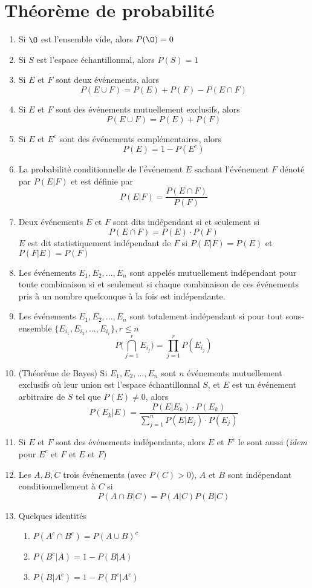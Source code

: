 \documentclass{article}
\renewcommand{\emptyset}{\O}
\begin{document}
\section*{Théorème de probabilité}
	\begin{enumerate}
		\item Si $\emptyset$ est l'ensemble vide, alors $P(\emptyset)=0$
		\item Si $S$ est l'espace échantillonnal, alors $P(S)=1$
		\item Si $E$ et $F$ sont deux événements, alors
		\[P(E\cup F) = P(E) + P(F) - P(E\cap F)\]
		\item Si $E$ et $F$ sont des événements mutuellement exclusifs, alors
		\[P(E\cup F) = P(E) + P(F)\]
		\item Si $E$ et $E^c$ sont des événements complémentaires, alors
		\[P(E) = 1 - P(E^c)\]
		\item La probabilité conditionnelle de l'événement $E$ sachant l'événement $F$ dénoté par $P(E|F)$ et est définie par
		\[P(E|F)=\frac{P(E\cap F)}{P(F)}\]
		\item Deux événements $E$ et $F$ sont dits indépendant si et seulement si
		\[P(E\cap F)=P(E)\cdot P(F)\]
		$E$ est dit statistiquement indépendant de $F$ si $P(E|F)=P(E)$ et $P(F|E)=P(F)$
		\item Les événements $E_1,E_2,...,E_n$ sont appelés mutuellement indépendant pour toute combinaison si et seulement si chaque combinaison de ces événements pris à un nombre quelconque à la fois est indépendante.
		\item Les événements $E_1,E_2,...,E_n$ sont totalement indépendant si pour tout sous-ensemble \(\{E_{i_1},E_{i_2},...,E_{i_r}\}, r\leq n\)
		\[P\Bigg(\bigcap_{j=1}^r E_{i_j}\Bigg)=\prod_{j=1}^{r}P(E_{i_j})\]
		\item (Théorème de Bayes) Si $E_1,E_2,...,E_n$ sont $n$ événements mutuellement exclusifs où leur union est l'espace échantillonnal $S$, et $E$ est un événement arbitraire de $S$ tel que $P(E)\neq 0$, alors
		\[P(E_k|E)=\frac{P(E|E_k)\cdot P(E_k)}{\sum_{j=1}^{n}P(E|E_j)\cdot P(E_j)}\]
		\item Si $E$ et $F$ sont des événements indépendants, alors $E$ et $F^c$ le sont aussi (\textit{idem} pour $E^c$ et $F$ et $E$ et $F$)
		\item Les $A,B,C$ trois  événements (avec $P(C)>0$), $A$ et $B$ sont indépendant conditionnellement à $C$ si \[P(A\cap B|C)=P(A|C)P(B|C)\]
		\item Quelques identités
		\begin{enumerate}
			\item \(P(A^c \cap B^c) = P(A\cup B)^c\)
			\item \(P(B^c|A)= 1-P(B|A)\)
			\item \(P(B|A^c)= 1-P(B^c|A^c)\)
		\end{enumerate}
	\end{enumerate}
\end{document}
